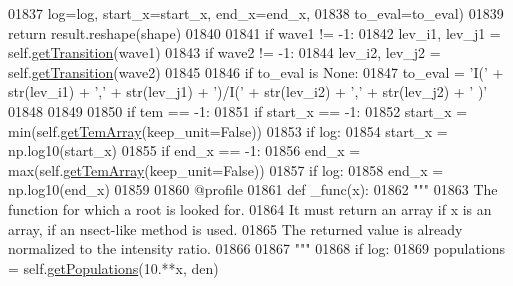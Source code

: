 \begin{DoxyCode}
{{01837                                            log=log, start\_x=start\_x, end\_x=end\_x,
01838                                            to\_eval=to\_eval)
01839             \textcolor{keywordflow}{return} result.reshape(shape)
01840             
01841         \textcolor{keywordflow}{if} wave1 != -1:
01842             lev\_i1, lev\_j1 = self.\hyperlink{classpyneb_1_1core_1_1pynebcore_1_1_atom_a7c9f17a3d9e841267add92377d9d1ede}{getTransition}(wave1)
01843         \textcolor{keywordflow}{if} wave2 != -1:
01844             lev\_i2, lev\_j2 = self.\hyperlink{classpyneb_1_1core_1_1pynebcore_1_1_atom_a7c9f17a3d9e841267add92377d9d1ede}{getTransition}(wave2)
01845 
01846         \textcolor{keywordflow}{if} to\_eval \textcolor{keywordflow}{is} \textcolor{keywordtype}{None}:
01847             to\_eval = \textcolor{stringliteral}{'I('} + str(lev\_i1) + \textcolor{stringliteral}{','} + str(lev\_j1) + \textcolor{stringliteral}{')/I('} + str(lev\_i2) + \textcolor{stringliteral}{','} + str(lev\_j2) + \textcolor{stringliteral}{'
      )'}
01848 
01849 
01850         \textcolor{keywordflow}{if} tem == -1:
01851             \textcolor{keywordflow}{if} start\_x == -1:
01852                 start\_x = min(self.\hyperlink{classpyneb_1_1core_1_1pynebcore_1_1_atom_a764cc048a87d3d89204a616774bdaac6}{getTemArray}(keep\_unit=\textcolor{keyword}{False}))
01853                 \textcolor{keywordflow}{if} log:
01854                     start\_x = np.log10(start\_x)
01855             \textcolor{keywordflow}{if} end\_x == -1:
01856                 end\_x = max(self.\hyperlink{classpyneb_1_1core_1_1pynebcore_1_1_atom_a764cc048a87d3d89204a616774bdaac6}{getTemArray}(keep\_unit=\textcolor{keyword}{False}))
01857                 \textcolor{keywordflow}{if} log:
01858                     end\_x = np.log10(end\_x)
01859             
01860             @profile
01861             \textcolor{keyword}{def }\_func(x):
01862                 \textcolor{stringliteral}{"""}
01863 \textcolor{stringliteral}{                The function for which a root is looked for.}
01864 \textcolor{stringliteral}{                It must return an array if x is an array, if an nsect-like method is used.}
01865 \textcolor{stringliteral}{                The returned value is already normalized to the intensity ratio.}
01866 \textcolor{stringliteral}{}
01867 \textcolor{stringliteral}{                """}
01868                 \textcolor{keywordflow}{if} log:
01869                     populations = self.\hyperlink{classpyneb_1_1core_1_1pynebcore_1_1_atom_aab7496403c8aaef40ab3b20b5c00e9f0}{getPopulations}(10.**x, den)
}}
\end{DoxyCode}
